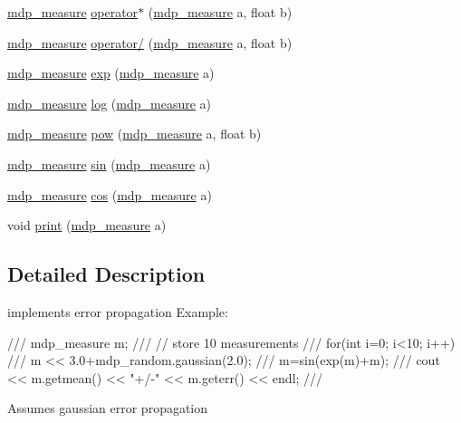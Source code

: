 \begin{DoxyCompactItemize}
\item 
\hyperlink{classmdp__measure}{mdp\_\-measure} \hyperlink{classmdp__measure_aa5dcdce1ad85ba147460781e805dae6d}{operator$\ast$} (\hyperlink{classmdp__measure}{mdp\_\-measure} a, float b)
\item 
\hyperlink{classmdp__measure}{mdp\_\-measure} \hyperlink{classmdp__measure_ae62ef8561fd82d07834885f6c7569a23}{operator/} (\hyperlink{classmdp__measure}{mdp\_\-measure} a, float b)
\item 
\hyperlink{classmdp__measure}{mdp\_\-measure} \hyperlink{classmdp__measure_aa27ae5954c296694bf711dbec8fb312a}{exp} (\hyperlink{classmdp__measure}{mdp\_\-measure} a)
\item 
\hyperlink{classmdp__measure}{mdp\_\-measure} \hyperlink{classmdp__measure_a4762a50b84b4f961dd46f2bb395b2506}{log} (\hyperlink{classmdp__measure}{mdp\_\-measure} a)
\item 
\hyperlink{classmdp__measure}{mdp\_\-measure} \hyperlink{classmdp__measure_adcca585e0856bb912b8069aaf56f9d95}{pow} (\hyperlink{classmdp__measure}{mdp\_\-measure} a, float b)
\item 
\hyperlink{classmdp__measure}{mdp\_\-measure} \hyperlink{classmdp__measure_a7889df6f1c1f8cfd6cb9aa0a3f9a2ec9}{sin} (\hyperlink{classmdp__measure}{mdp\_\-measure} a)
\item 
\hyperlink{classmdp__measure}{mdp\_\-measure} \hyperlink{classmdp__measure_af1f3876a19982932b4c6a1011f049350}{cos} (\hyperlink{classmdp__measure}{mdp\_\-measure} a)
\item 
void \hyperlink{classmdp__measure_a2974468f862cb8c3fe0a0034a4bd2e08}{print} (\hyperlink{classmdp__measure}{mdp\_\-measure} a)
\end{DoxyCompactItemize}


\subsection{Detailed Description}
implements error propagation Example: \begin{DoxyVerb}
///    mdp_measure m;
///    // store 10 measurements
///    for(int i=0; i<10; i++) 
///       m << 3.0+mdp_random.gaussian(2.0);
///    m=sin(exp(m)+m);
///    cout << m.getmean() << "+/-" << m.geterr() << endl;
/// \end{DoxyVerb}
 Assumes gaussian error propagation 

